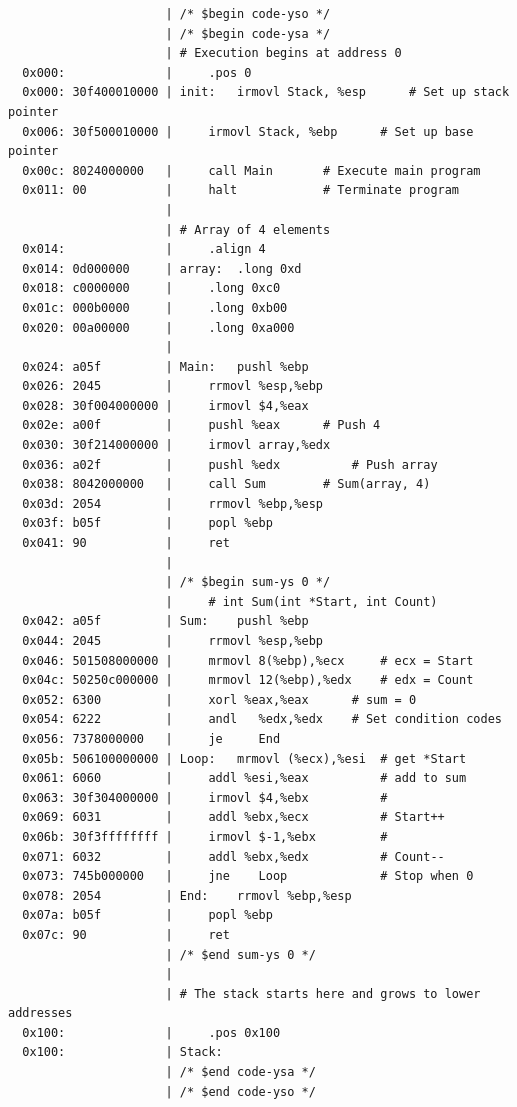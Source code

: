 \begin{verbatim}
                      | /* $begin code-yso */
                      | /* $begin code-ysa */
                      | # Execution begins at address 0 
  0x000:              |     .pos 0 
  0x000: 30f400010000 | init:   irmovl Stack, %esp      # Set up stack pointer  
  0x006: 30f500010000 |     irmovl Stack, %ebp      # Set up base pointer   
  0x00c: 8024000000   |     call Main       # Execute main program
  0x011: 00           |     halt            # Terminate program 
                      | 
                      | # Array of 4 elements
  0x014:              |     .align 4    
  0x014: 0d000000     | array:  .long 0xd
  0x018: c0000000     |     .long 0xc0
  0x01c: 000b0000     |     .long 0xb00
  0x020: 00a00000     |     .long 0xa000    
                      | 
  0x024: a05f         | Main:   pushl %ebp 
  0x026: 2045         |     rrmovl %esp,%ebp
  0x028: 30f004000000 |     irmovl $4,%eax  
  0x02e: a00f         |     pushl %eax      # Push 4
  0x030: 30f214000000 |     irmovl array,%edx
  0x036: a02f         |     pushl %edx          # Push array
  0x038: 8042000000   |     call Sum        # Sum(array, 4)
  0x03d: 2054         |     rrmovl %ebp,%esp
  0x03f: b05f         |     popl %ebp
  0x041: 90           |     ret 
                      | 
                      | /* $begin sum-ys 0 */
                      |     # int Sum(int *Start, int Count)
  0x042: a05f         | Sum:    pushl %ebp
  0x044: 2045         |     rrmovl %esp,%ebp
  0x046: 501508000000 |     mrmovl 8(%ebp),%ecx     # ecx = Start
  0x04c: 50250c000000 |     mrmovl 12(%ebp),%edx    # edx = Count
  0x052: 6300         |     xorl %eax,%eax      # sum = 0
  0x054: 6222         |     andl   %edx,%edx    # Set condition codes
  0x056: 7378000000   |     je     End
  0x05b: 506100000000 | Loop:   mrmovl (%ecx),%esi  # get *Start
  0x061: 6060         |     addl %esi,%eax          # add to sum
  0x063: 30f304000000 |     irmovl $4,%ebx          # 
  0x069: 6031         |     addl %ebx,%ecx          # Start++
  0x06b: 30f3ffffffff |     irmovl $-1,%ebx         # 
  0x071: 6032         |     addl %ebx,%edx          # Count--
  0x073: 745b000000   |     jne    Loop             # Stop when 0
  0x078: 2054         | End:    rrmovl %ebp,%esp
  0x07a: b05f         |     popl %ebp
  0x07c: 90           |     ret
                      | /* $end sum-ys 0 */
                      | 
                      | # The stack starts here and grows to lower addresses
  0x100:              |     .pos 0x100      
  0x100:              | Stack:   
                      | /* $end code-ysa */
                      | /* $end code-yso */
\end{verbatim}

